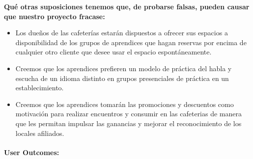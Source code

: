 \textbf{Qué otras suposiciones tenemos que, de probarse falsas, pueden
causar que nuestro proyecto fracase:}

\begin{itemize}
\item
  Los dueños de las cafeterías estarán dispuestos a ofrecer sus espacios
  a disponibilidad de los grupos de aprendices que hagan reservas por
  encima de cualquier otro cliente que desee usar el espacio
  espontáneamente.
\item
  Creemos que los aprendices prefieren un modelo de práctica del habla y
  escucha de un idioma distinto en grupos presenciales de práctica en un
  establecimiento.
\item
  Creemos que los aprendices tomarán las promociones y descuentos como
  motivación para realizar encuentros y consumir en las cafeterias de
  manera que les permitan impulsar las ganancias y mejorar el
  reconocimiento de los locales afiliados.
\end{itemize}

\paragraph{User
Outcomes:}\label{report__10-cap1-introduccion.md__user-outcomes}

